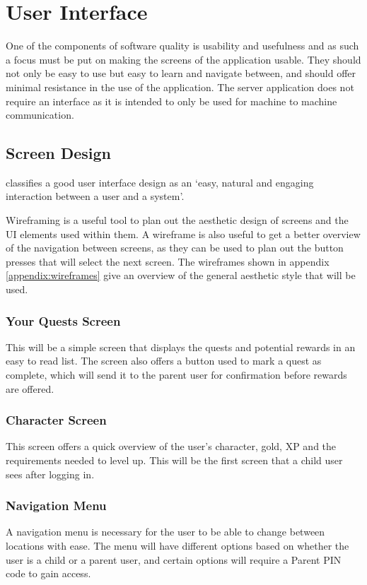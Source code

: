 \section{User Interface}
One of the components of software quality is usability and usefulness \citep{isosoftwarequality} and as such a focus must be put on making the screens of the application usable.
They should not only be easy to use but easy to learn and navigate between, and should offer minimal resistance in the use of the application.
The server application does not require an interface as it is intended to only be used for machine to machine communication.

\subsection{Screen Design}
\cite{stone2005user} classifies a good user interface design as an `easy, natural and engaging interaction between a user and a system'.

Wireframing is a useful tool to plan out the aesthetic design of screens and the UI elements used within them. 
A wireframe is also useful to get a better overview of the navigation between screens, as they can be used to plan out the button presses that will select the next screen.
The wireframes shown in appendix \ref{appendix:wireframes} give an overview of the general aesthetic style that will be used.

\subsubsection{Your Quests Screen}
This will be a simple screen that displays the quests and potential rewards in an easy to read list.
The screen also offers a button used to mark a quest as complete, which will send it to the parent user for confirmation before rewards are offered.

\subsubsection{Character Screen}
This screen offers a quick overview of the user's character, gold, XP and the requirements needed to level up.
This will be the first screen that a child user sees after logging in.

\subsubsection{Navigation Menu}
A navigation menu is necessary for the user to be able to change between locations with ease.
The menu will have different options based on whether the user is a child or a parent user, and certain options will require a Parent PIN code to gain access. 

